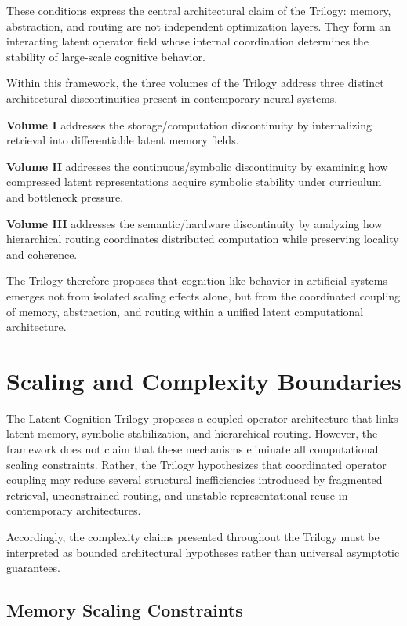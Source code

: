 These conditions express the central architectural claim of the Trilogy: memory, abstraction, and routing are not independent optimization layers. They form an interacting latent operator field whose internal coordination determines the stability of large-scale cognitive behavior.

Within this framework, the three volumes of the Trilogy address three distinct architectural discontinuities present in contemporary neural systems.

\textbf{Volume I }addresses the storage/computation discontinuity by internalizing retrieval into differentiable latent memory fields.

\textbf{Volume II} addresses the continuous/symbolic discontinuity by examining how compressed latent representations acquire symbolic stability under curriculum and bottleneck pressure.

\textbf{Volume III} addresses the semantic/hardware discontinuity by analyzing how hierarchical routing coordinates distributed computation while preserving locality and coherence.

The Trilogy therefore proposes that cognition-like behavior in artificial systems emerges not from isolated scaling effects alone, but from the coordinated coupling of memory, abstraction, and routing within a unified latent computational architecture.

\section*{Scaling and Complexity Boundaries}

The Latent Cognition Trilogy proposes a coupled-operator architecture that links latent memory, symbolic stabilization, and hierarchical routing. However, the framework does not claim that these mechanisms eliminate all computational scaling constraints. Rather, the Trilogy hypothesizes that coordinated operator coupling may reduce several structural inefficiencies introduced by fragmented retrieval, unconstrained routing, and unstable representational reuse in contemporary architectures.

Accordingly, the complexity claims presented throughout the Trilogy must be interpreted as bounded architectural hypotheses rather than universal asymptotic guarantees.

\subsection*{Memory Scaling Constraints}

